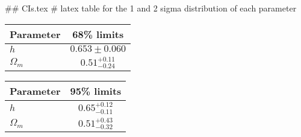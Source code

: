 ## CIs.tex
# latex table for the 1 and 2 sigma distribution of each parameter

\begin{tabular} { l  c}
 Parameter &  68\% limits\\
\hline
{\boldmath$h              $} & $0.653\pm 0.060            $\\
{\boldmath$\Omega_m       $} & $0.51^{+0.11}_{-0.24}      $\\
\hline
\end{tabular}

\begin{tabular} { l  c}
 Parameter &  95\% limits\\
\hline
{\boldmath$h              $} & $0.65^{+0.12}_{-0.11}      $\\
{\boldmath$\Omega_m       $} & $0.51^{+0.43}_{-0.32}      $\\
\hline
\end{tabular}
